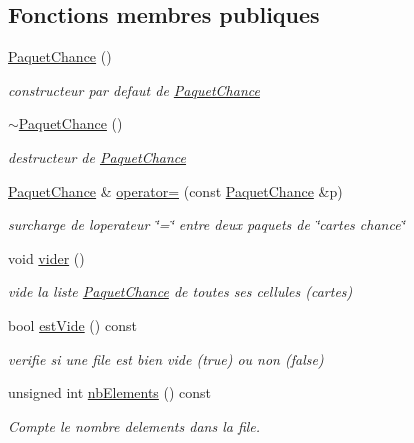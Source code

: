 \subsection*{Fonctions membres publiques}
\begin{DoxyCompactItemize}
\item 
\hyperlink{classPaquetChance_a10e2c02b35ae31b7a219b18aa58738af}{Paquet\+Chance} ()
\begin{DoxyCompactList}\small\item\em constructeur par defaut de \hyperlink{classPaquetChance}{Paquet\+Chance} \end{DoxyCompactList}\item 
\hyperlink{classPaquetChance_a70a33d05a371aaa92c9c863f7295cb6c}{$\sim$\+Paquet\+Chance} ()
\begin{DoxyCompactList}\small\item\em destructeur de \hyperlink{classPaquetChance}{Paquet\+Chance} \end{DoxyCompactList}\item 
\hyperlink{classPaquetChance}{Paquet\+Chance} \& \hyperlink{classPaquetChance_aed5ae2e16c0deed0229f8716d77757d5}{operator=} (const \hyperlink{classPaquetChance}{Paquet\+Chance} \&p)
\begin{DoxyCompactList}\small\item\em surcharge de l\textquotesingle{}operateur \char`\"{}=\char`\"{} entre deux paquets de \char`\"{}cartes chance\char`\"{} \end{DoxyCompactList}\item 
void \hyperlink{classPaquetChance_a59f3f6915d1acb57be699275dbb4bd4a}{vider} ()
\begin{DoxyCompactList}\small\item\em vide la liste \hyperlink{classPaquetChance}{Paquet\+Chance} de toutes ses cellules (cartes) \end{DoxyCompactList}\item 
bool \hyperlink{classPaquetChance_a0acfade153190db7e0e78494bb5153cb}{est\+Vide} () const 
\begin{DoxyCompactList}\small\item\em verifie si une file est bien vide (true) ou non (false) \end{DoxyCompactList}\item 
unsigned int \hyperlink{classPaquetChance_aa28685cae7faba322a0feb2cdd5042cd}{nb\+Elements} () const 
\begin{DoxyCompactList}\small\item\em Compte le nombre d\textquotesingle{}elements dans la file. \end{DoxyCompactList}\item 

\end{DoxyCompactItemize}
